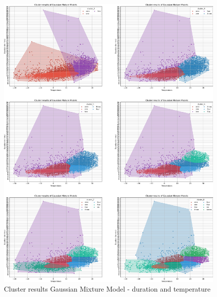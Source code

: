\begin{figure}[H]
   \centering
    \includegraphics[width=1\linewidth]{./Figures/Clusters_Gaussian_Duration_Temp.png}
    \caption{Cluster results Gaussian Mixture Model - duration and temperature}
    \label{Clusters_Gaussian_Duration_Temp}
\end{figure}

